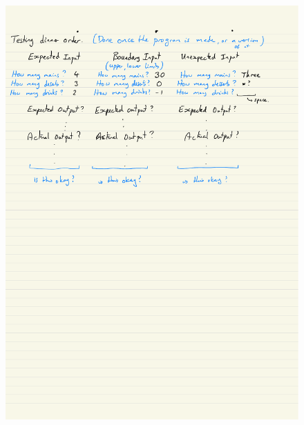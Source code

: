 \documentclass[a4paper,12pt]{article}
\begin{document}
\begin{figure} [!h]
	\centering
	\includegraphics[width=16cm]{iterative_processes/Testing.pdf}
\end{figure}
\end{document}
